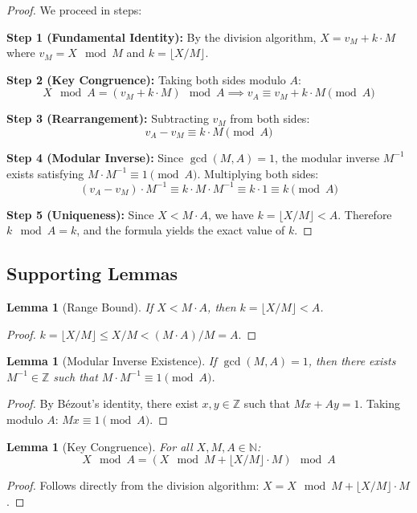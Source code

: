 \documentclass[11pt,a4paper]{article}
\newtheorem{lemma}[theorem]{Lemma}
\begin{document}
\begin{proof}
We proceed in steps:

\textbf{Step 1 (Fundamental Identity):} By the division algorithm, $X = v_M + k \cdot M$ where $v_M = X \mod M$ and $k = \lfloor X/M \rfloor$.

\textbf{Step 2 (Key Congruence):} Taking both sides modulo $A$:
\[
X \mod A = (v_M + k \cdot M) \mod A \implies v_A \equiv v_M + k \cdot M \pmod{A}
\]

\textbf{Step 3 (Rearrangement):} Subtracting $v_M$ from both sides:
\[
v_A - v_M \equiv k \cdot M \pmod{A}
\]

\textbf{Step 4 (Modular Inverse):} Since $\gcd(M, A) = 1$, the modular inverse $M^{-1}$ exists satisfying $M \cdot M^{-1} \equiv 1 \pmod{A}$. Multiplying both sides:
\[
(v_A - v_M) \cdot M^{-1} \equiv k \cdot M \cdot M^{-1} \equiv k \cdot 1 \equiv k \pmod{A}
\]

\textbf{Step 5 (Uniqueness):} Since $X < M \cdot A$, we have $k = \lfloor X/M \rfloor < A$. Therefore $k \mod A = k$, and the formula yields the exact value of $k$.
\end{proof}

\subsection{Supporting Lemmas}

\begin{lemma}[Range Bound]
If $X < M \cdot A$, then $k = \lfloor X/M \rfloor < A$.
\end{lemma}
\begin{proof}
$k = \lfloor X/M \rfloor \leq X/M < (M \cdot A)/M = A$.
\end{proof}

\begin{lemma}[Modular Inverse Existence]
If $\gcd(M, A) = 1$, then there exists $M^{-1} \in \mathbb{Z}$ such that $M \cdot M^{-1} \equiv 1 \pmod{A}$.
\end{lemma}
\begin{proof}
By B\'{e}zout's identity, there exist $x, y \in \mathbb{Z}$ such that $Mx + Ay = 1$. Taking modulo $A$: $Mx \equiv 1 \pmod{A}$.
\end{proof}

\begin{lemma}[Key Congruence]
For all $X, M, A \in \mathbb{N}$:
\[
X \mod A = (X \mod M + \lfloor X/M \rfloor \cdot M) \mod A
\]
\end{lemma}
\begin{proof}
Follows directly from the division algorithm: $X = X \mod M + \lfloor X/M \rfloor \cdot M$.
\end{proof}
\end{document}
